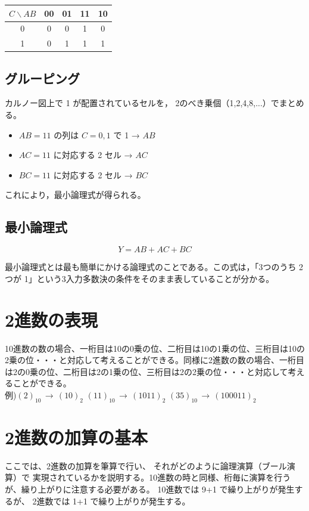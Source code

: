 \begin{center}
\begin{tabular}{c|cccc}
$C \backslash AB$ & 00 & 01 & 11 & 10 \\
\hline
0 & 0 & 0 & 1 & 0 \\
1 & 0 & 1 & 1 & 1 \\
\end{tabular}
\end{center}

\subsection{グルーピング}

カルノー図上で 1 が配置されているセルを，
2のべき乗個（1,2,4,8,...）でまとめる。

\begin{itemize}
  \item $AB=11$ の列は $C=0,1$ で 1 → $AB$
  \item $AC=11$ に対応する 2 セル → $AC$
  \item $BC=11$ に対応する 2 セル → $BC$
\end{itemize}

これにより，最小論理式が得られる。

\subsection{最小論理式}

\[
Y = AB + AC + BC
\]

最小論理式とは最も簡単にかける論理式のことである。この式は，「3つのうち 2つが 1」という3入力多数決の条件をそのまま表していることが分かる。

\section{2進数の表現}
10進数の数の場合、一桁目は10の0乗の位、二桁目は10の1乗の位、三桁目は10の2乗の位・・・と対応して考えることができる。同様に2進数の数の場合、一桁目は2の0乗の位、二桁目は2の1乗の位、三桁目は2の2乗の位・・・と対応して考えることができる。\\
例)\quad$(2)_{10} \,→\, (10)_2$\quad\,\,$(11)_{10}\,→\, (1011)_2$\quad\,\,$(35)_{10}\,→\, (100011)_2$
\section{2進数の加算の基本}
ここでは、2進数の加算を筆算で行い、
それがどのように論理演算（ブール演算）で
実現されているかを説明する。10進数の時と同様、桁毎に演算を行うが、繰り上がりに注意する必要がある。
10進数では 9+1 で繰り上がりが発生するが、
2進数では 1+1 で繰り上がりが発生する。


